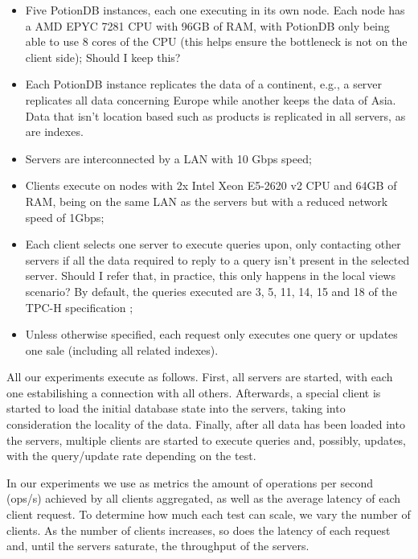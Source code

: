 \documentclass{vldb}
\newcommand{\grumbler}[2]{{\color{red}{\bf #1:} #2}}
\newcommand{\andre}[1]{\grumbler{andre}{#1}}
\begin{document}
\begin{itemize}
	\item Five PotionDB instances, each one executing in its own node.
	Each node has a AMD EPYC 7281 CPU with 96GB of RAM, with PotionDB only being able to use 8 cores of the CPU (this helps ensure the bottleneck is not on the client side); \andre{Should I keep this?}
	\item Each PotionDB instance replicates the data of a continent, e.g., a server replicates all data concerning Europe while another keeps the data of Asia. Data that isn't location based such as products is replicated in all servers, as are indexes.
	\item Servers are interconnected by a LAN with 10 Gbps speed;
	\item Clients execute on nodes with 2x Intel Xeon E5-2620 v2 CPU and 64GB of RAM, being on the same LAN as the servers but with a reduced network speed of 1Gbps;
	\item Each client selects one server to execute queries upon, only contacting other servers if all the data required to reply to a query isn't present in the selected server. \andre{Should I refer that, in practice, this only happens in the local views scenario?} By default, the queries executed are 3, 5, 11, 14, 15 and 18 of the TPC-H specification \cite{tpch};
	\item Unless otherwise specified, each request only executes one query or updates one sale (including all related indexes).
\end{itemize}

All our experiments execute as follows.
First, all servers are started, with each one estabilishing a connection with all others.
Afterwards, a special client is started to load the initial database state into the servers, taking into consideration the locality of the data.
Finally, after all data has been loaded into the servers, multiple clients are started to execute queries and, possibly, updates, with the query/update rate depending on the test.

In our experiments we use as metrics the amount of operations per second (ops/s) achieved by all clients aggregated, as well as the average latency of each client request.
To determine how much each test can scale, we vary the number of clients.
As the number of clients increases, so does the latency of each request and, until the servers saturate, the throughput of the servers.
\end{document}
